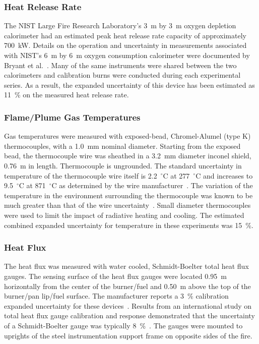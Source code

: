 \documentclass[twoside]{uocthesis}
\begin{document}
{\subsubsection{Heat Release Rate}

The NIST Large Fire Research Laboratory's 3~m by 3~m oxygen depletion calorimeter had an estimated peak heat release rate capacity of approximately 700~kW.  Details on the operation and uncertainty in measurements associated with NIST’s 6~m by 6~m oxygen consumption calorimeter were documented by Bryant et al.~\cite{Bryant:2004}. Many of the same instruments were shared between the two calorimeters and calibration burns were conducted during each experimental series.  As a result, the expanded uncertainty of this device has been estimated as 11~\% on the measured heat release rate.

\subsubsection{Flame/Plume Gas Temperatures}

Gas temperatures were measured with exposed-bead, Chromel-Alumel (type K) thermocouples, with a 1.0~mm nominal diameter.  Starting from the exposed bead, the thermocouple wire was sheathed in a 3.2~mm diameter inconel shield, 0.76~m in length. Thermocouple is ungrounded. The standard uncertainty in temperature of the thermocouple wire itself is 2.2~$^\circ$C at 277~$^\circ$C and increases to 9.5~$^\circ$C at 871~$^\circ$C as determined by the wire manufacturer~\cite{Omega}.  The variation of the temperature in the environment surrounding the thermocouple was known to be much greater than that of the wire uncertainty~\cite{Blevins:1999,Pitts:2001}. Small diameter thermocouples were used to limit the impact of radiative heating and cooling.  The estimated combined expanded uncertainty for temperature in these experiments was 15~\%.

\subsubsection{Heat Flux}

The heat flux was measured with water cooled, Schmidt-Boelter total heat flux gauges. The sensing surface of the heat flux gauges were located 0.95~m horizontally from the center of the burner/fuel and 0.50~m above the top of the burner/pan lip/fuel surface.  The manufacturer reports a 3~\% calibration expanded uncertainty for these devices~\cite{Medtherm}. Results from an international study on total heat flux gauge calibration and response demonstrated that the uncertainty of a Schmidt-Boelter gauge was typically 8~\%~\cite{Pitts:2006}.  The gauges were mounted to uprights of the steel instrumentation support frame on opposite sides of the fire.

}
\end{document}
